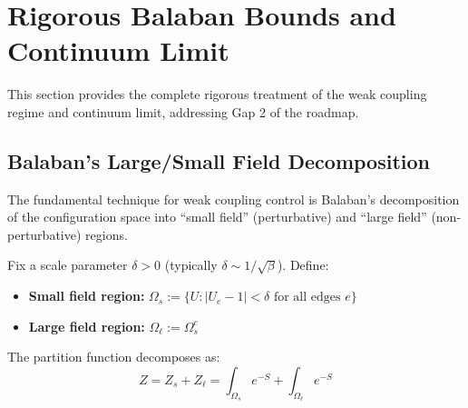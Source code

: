 \section{Rigorous Balaban Bounds and Continuum Limit}
\label{sec:balaban-continuum}

This section provides the complete rigorous treatment of the weak coupling 
regime and continuum limit, addressing Gap 2 of the roadmap.

\subsection{Balaban's Large/Small Field Decomposition}
\label{subsec:balaban-decomposition}

The fundamental technique for weak coupling control is Balaban's decomposition 
of the configuration space into ``small field'' (perturbative) and ``large field'' 
(non-perturbative) regions.

\begin{definition}
\label{def:small-large-field}
Fix a scale parameter $\delta > 0$ (typically $\delta \sim 1/\sqrt{\beta}$). Define:
\begin{itemize}
\item \textbf{Small field region:} $\Omega_s := \{U : |U_e - 1| < \delta \text{ for all edges } e\}$
\item \textbf{Large field region:} $\Omega_\ell := \Omega_s^c$
\end{itemize}

The partition function decomposes as:
\[
Z = Z_s + Z_\ell = \int_{\Omega_s} e^{-S} + \int_{\Omega_\ell} e^{-S}
\]
\end{definition}

